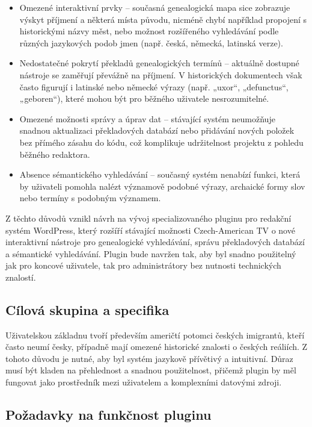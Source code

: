 \documentclass[czech, ba, kiv, he]{fasthesis}
\begin{document}
\begin{itemize}
\item Omezené interaktivní prvky – současná genealogická mapa sice zobrazuje výskyt příjmení a některá místa původu, nicméně chybí například propojení s historickými názvy měst, nebo možnost rozšířeného vyhledávání podle různých jazykových podob jmen (např. česká, německá, latinská verze).
\item Nedostatečné pokrytí překladů genealogických termínů – aktuálně dostupné nástroje se zaměřují převážně na příjmení. V historických dokumentech však často figurují i latinské nebo německé výrazy (např. „uxor“, „defunctus“, „geboren“), které mohou být pro běžného uživatele nesrozumitelné.
\item Omezené možnosti správy a úprav dat – stávající systém neumožňuje snadnou aktualizaci překladových databází nebo přidávání nových položek bez přímého zásahu do kódu, což komplikuje udržitelnost projektu z pohledu běžného redaktora.
\item Absence sémantického vyhledávání – současný systém nenabízí funkci, která by uživateli pomohla nalézt významově podobné výrazy, archaické formy slov nebo termíny s podobným významem.
\end{itemize}

Z těchto důvodů vznikl návrh na vývoj specializovaného pluginu pro redakční systém WordPress, který rozšíří stávající možnosti Czech-American TV o nové interaktivní nástroje pro genealogické vyhledávání, správu překladových databází a sémantické vyhledávání. Plugin bude navržen tak, aby byl snadno použitelný jak pro koncové uživatele, tak pro administrátory bez nutnosti technických znalostí.

\subsection{Cílová skupina a specifika}

Uživatelskou základnu tvoří především američtí potomci českých imigrantů, kteří často neumí česky, případně mají omezené historické znalosti o českých reáliích. Z tohoto důvodu je nutné, aby byl systém jazykově přívětivý a intuitivní. Důraz musí být kladen na přehlednost a snadnou použitelnost, přičemž plugin by měl fungovat jako prostředník mezi uživatelem a komplexními datovými zdroji.

\subsection{Požadavky na funkčnost pluginu}
\end{document}
